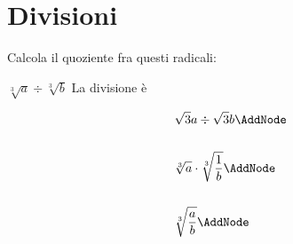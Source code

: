\section{Divisioni}
Calcola il quoziente fra questi radicali:
\tcbstartrecording
\begin{exercise}
	$\sqrt[3]{a}\div\sqrt[3]{b}$
	\tcblower
	La divisione è
	\begin{NodesList}
		\begin{align*}
		&\sqrt{3}{a}\div\sqrt{3}{b}\AddNode\\
		&\\
		&\sqrt[3]{a}\cdot\sqrt[3]{\dfrac{1}{b}}\AddNode\\
		&\\
		&\sqrt[3]{\dfrac{a}{b}}\AddNode
		\end{align*}
					
				\end{NodesList}
			\end{exercise}
			
